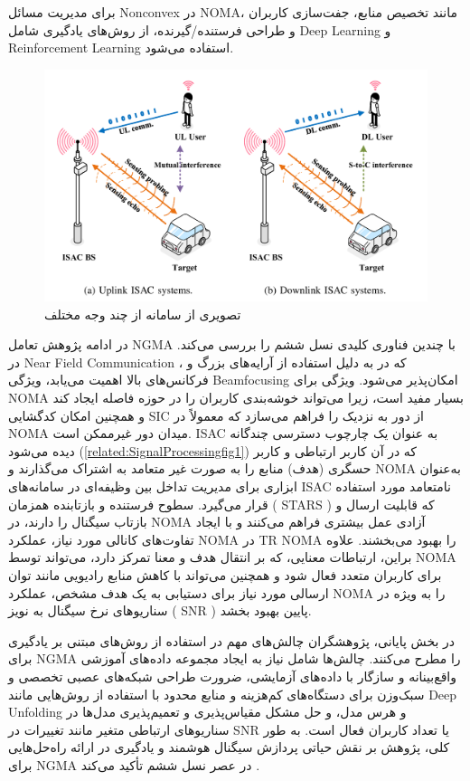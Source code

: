       برای مدیریت مسائل 
\gls{Nonconvex}
      در 
\gls{NOMA}،
       مانند تخصیص منابع، جفت‌سازی کاربران و طراحی فرستنده/گیرنده، از روش‌های یادگیری شامل 
\gls{Deep Learning}
 و 
\gls{Reinforcement Learning}
  استفاده می‌شود.
 \begin{figure}
	\centering
	\includegraphics[width=0.7\linewidth]{./Pic/SignalProcessing_fig1}
	\caption[ تصویری از سامانه  از چند وجه مختلف]{   تصویری از سامانه  از چند وجه مختلف \cite{SignalProcessing}}
		\label{related:SignalProcessingfig1}
\end{figure}
در ادامه پژوهش تعامل 
\gls{NGMA}
 با چندین فناوری کلیدی نسل ششم را بررسی می‌کند. در 
\gls{Near Field Communication}
 ، که در  به دلیل استفاده از آرایه‌های بزرگ و فرکانس‌های بالا اهمیت می‌یابد، ویژگی 
\gls{Beamfocusing}
 امکان‌پذیر می‌شود.  ویژگی برای 
\gls{NOMA}
  بسیار مفید است، زیرا می‌تواند خوشه‌بندی کاربران را در حوزه فاصله ایجاد کند و همچنین امکان کدگشایی 
\gls{SIC}
   از دور به نزدیک را فراهم می‌سازد که معمولاً در 
\gls{NOMA}
    میدان دور غیرممکن است. 
\gls{ISAC}
     به عنوان یک چارچوب دسترسی چندگانه دیده می‌شود 
(\autoref{related:SignalProcessingfig1})
      که در آن کاربر ارتباطی و کاربر حسگری (هدف) منابع را به صورت غیر متعامد به اشتراک می‌گذارند و 
\gls{NOMA}
      به‌عنوان ابزاری برای مدیریت تداخل بین وظیفه‌ای در سامانه‌های 
\gls{ISAC}
       نامتعامد مورد استفاده قرار می‌گیرد. سطوح فرستنده و بازتابنده همزمان ( 
\gls{STARS}
      )  که قابلیت ارسال و بازتاب سیگنال را دارند، در 
\gls{NOMA}
      آزادی عمل بیشتری فراهم می‌کنند و با ایجاد تفاوت‌های کانالی مورد نیاز، عملکرد 
\gls{NOMA}
       در 
\gls{TR NOMA}
        را بهبود می‌بخشند. علاوه براین، ارتباطات معنایی، که بر انتقال هدف و معنا تمرکز دارد، می‌تواند توسط 
\gls{NOMA}
         برای کاربران متعدد فعال شود و همچنین می‌تواند با کاهش منابع رادیویی مانند توان ارسالی مورد نیاز برای دستیابی به یک هدف مشخص، عملکرد 
\gls{NOMA}
          را به ویژه در سناریوهای نرخ سیگنال به نویز (
\gls{SNR}
          ) پایین بهبود بخشد.

در بخش پایانی، پژوهشگران چالش‌های مهم در استفاده از روش‌های مبتنی بر یادگیری برای 
\gls{NGMA}
 را مطرح می‌کنند.  چالش‌ها شامل نیاز به ایجاد مجموعه داده‌های آموزشی واقع‌بینانه و سازگار با داده‌های آزمایشی، ضرورت طراحی شبکه‌های عصبی تخصصی و سبک‌وزن برای دستگاه‌های کم‌هزینه و منابع محدود با استفاده از روش‌هایی مانند 
\gls{Deep Unfolding}
 و هرس مدل، و حل مشکل مقیاس‌پذیری و تعمیم‌پذیری مدل‌ها در سناریوهای ارتباطی متغیر مانند تغییرات در 
\gls{SNR}
  یا تعداد کاربران فعال است. به طور کلی، پژوهش بر نقش حیاتی پردازش سیگنال هوشمند و یادگیری در ارائه راه‌حل‌هایی برای 
\gls{NGMA}
  در عصر نسل ششم تأکید می‌کند
\cite{SignalProcessing}.
